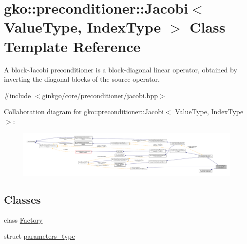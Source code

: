 \hypertarget{classgko_1_1preconditioner_1_1Jacobi}{}\section{gko\+:\+:preconditioner\+:\+:Jacobi$<$ Value\+Type, Index\+Type $>$ Class Template Reference}
\label{classgko_1_1preconditioner_1_1Jacobi}


A block-\/\+Jacobi preconditioner is a block-\/diagonal linear operator, obtained by inverting the diagonal blocks of the source operator.  




{\ttfamily \#include $<$ginkgo/core/preconditioner/jacobi.\+hpp$>$}



Collaboration diagram for gko\+:\+:preconditioner\+:\+:Jacobi$<$ Value\+Type, Index\+Type $>$\+:
\nopagebreak
\begin{figure}[H]
\begin{center}
\leavevmode
\includegraphics[width=350pt]{classgko_1_1preconditioner_1_1Jacobi__coll__graph}
\end{center}
\end{figure}
\subsection*{Classes}
\begin{DoxyCompactItemize}
\item 
class \hyperlink{classgko_1_1preconditioner_1_1Jacobi_1_1Factory}{Factory}
\item 
struct \hyperlink{structgko_1_1preconditioner_1_1Jacobi_1_1parameters__type}{parameters\+\_\+type}
\end{DoxyCompactItemize}
